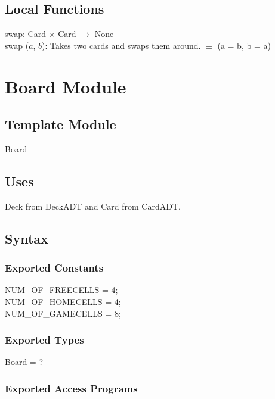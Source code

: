 \documentclass[12pt]{article}
\begin{document}
 \subsection* {Local Functions} 
 \noindent swap: Card $\times$ Card $\rightarrow$ None\\
\noindent swap ($a$, $b$):  Takes two cards and swaps them around. 
$\equiv$ (a = b, b = a)


\newpage

\section* {Board Module}

\subsection*{Template Module}

Board

\subsection* {Uses}
Deck from DeckADT and Card from CardADT.


\subsection* {Syntax}

\subsubsection* {Exported Constants}
NUM\_OF\_FREECELLS = 4;\\
NUM\_OF\_HOMECELLS = 4;\\
NUM\_OF\_GAMECELLS = 8;
\subsubsection* {Exported Types}
Board = ?


\subsubsection* {Exported Access Programs}
\end{document}
